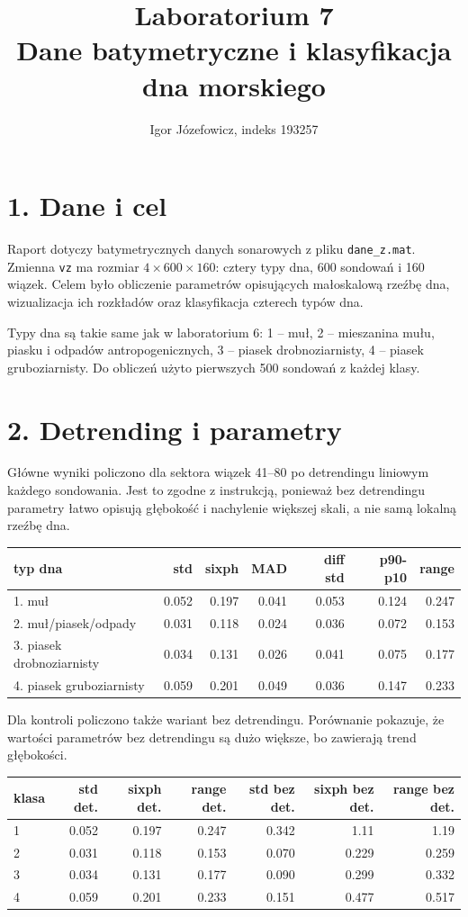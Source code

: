 \documentclass[11pt,a4paper]{article}
\title{Laboratorium 7\\Dane batymetryczne i klasyfikacja dna morskiego}
\author{Igor Józefowicz, indeks 193257}
\date{}
\begin{document}
\maketitle

\section*{1. Dane i cel}
Raport dotyczy batymetrycznych danych sonarowych z pliku \texttt{dane\_z.mat}. Zmienna \texttt{vz} ma rozmiar \(4 \times 600 \times 160\): cztery typy dna, 600 sondowań i 160 wiązek. Celem było obliczenie parametrów opisujących małoskalową rzeźbę dna, wizualizacja ich rozkładów oraz klasyfikacja czterech typów dna.

Typy dna są takie same jak w laboratorium 6: 1 -- muł, 2 -- mieszanina mułu, piasku i odpadów antropogenicznych, 3 -- piasek drobnoziarnisty, 4 -- piasek gruboziarnisty. Do obliczeń użyto pierwszych 500 sondowań z każdej klasy.

\section*{2. Detrending i parametry}
Główne wyniki policzono dla sektora wiązek 41--80 po detrendingu liniowym każdego sondowania. Jest to zgodne z instrukcją, ponieważ bez detrendingu parametry łatwo opisują głębokość i nachylenie większej skali, a nie samą lokalną rzeźbę dna.

\begin{table}[H]
\centering
\scriptsize
\begin{tabular}{lrrrrrr}
\toprule
typ dna & std & sixph & MAD & diff std & p90-p10 & range \\
\midrule
1. muł & 0.052 & 0.197 & 0.041 & 0.053 & 0.124 & 0.247 \\
2. muł/piasek/odpady & 0.031 & 0.118 & 0.024 & 0.036 & 0.072 & 0.153 \\
3. piasek drobnoziarnisty & 0.034 & 0.131 & 0.026 & 0.041 & 0.075 & 0.177 \\
4. piasek gruboziarnisty & 0.059 & 0.201 & 0.049 & 0.036 & 0.147 & 0.233 \\
\bottomrule
\end{tabular}
\end{table}

Dla kontroli policzono także wariant bez detrendingu. Porównanie pokazuje, że wartości parametrów bez detrendingu są dużo większe, bo zawierają trend głębokości.

\begin{table}[H]
\centering
\scriptsize
\begin{tabular}{lrrrrrr}
\toprule
klasa & std det. & sixph det. & range det. & std bez det. & sixph bez det. & range bez det. \\
\midrule
1 & 0.052 & 0.197 & 0.247 & 0.342 & 1.11 & 1.19 \\
2 & 0.031 & 0.118 & 0.153 & 0.070 & 0.229 & 0.259 \\
3 & 0.034 & 0.131 & 0.177 & 0.090 & 0.299 & 0.332 \\
4 & 0.059 & 0.201 & 0.233 & 0.151 & 0.477 & 0.517 \\
\bottomrule
\end{tabular}
\end{table}
\end{document}
